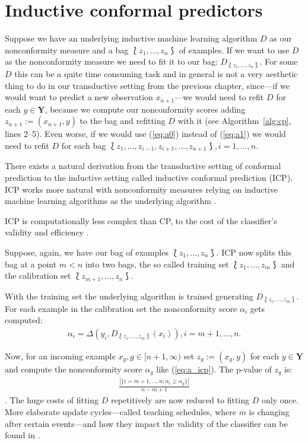 \documentclass[twoside,11pt]{article}
\begin{document}
\section{Inductive conformal predictors}
\label{sec:icp}

Suppose we have an underlying inductive machine learning
algorithm $D$ as our nonconformity measure and a bag
$\Lbag z_1,\dots,z_n \Rbag$ of examples. If we want to use
$D$ as the nonconformity measure we need to fit it to our
bag: $D_{\Lbag z_1,\dots,z_n \Rbag}$. For some $D$ this can
be a quite time consuming task and in general is not a very
aesthetic thing to do in our transductive setting from the
previous chapter, since---if we would want to predict a
new observation $x_{n+1}$---we would need to refit $D$ for
each $y \in \textbf{Y}$, because we compute our
nonconformity scores adding $z_{n+1} := (x_{n+1},y)$ to
the bag and refitting $D$ with it
(see Algorithm~\ref{alg:cp}, lines 2--5).
Even worse, if we would use (\ref{eq:a0}) instead of
(\ref{eq:a1}) we would need to refit $D$ for each bag
$\Lbag z_1,\dots,z_{i-1},z_{i+1},\dots,z_{n+1} \Rbag,
i=1,\dots,n$.

There exists a natural derivation from the transductive
setting of conformal prediction to the inductive setting
called inductive conformal prediction (ICP).
ICP works more natural with nonconformity measures relying
on inductive machine learning algorithms as the underlying
algorithm \citep[see][Chapter 4]{alrw}.

ICP is computationally less complex than CP, to the cost of
the classifier's validity and efficiency
\citep[see][Chapter 4]{alrw}.

Suppose, again, we have our bag of examples
$\Lbag z_1,\dots,z_n \Rbag$. ICP now splits this bag at a
point $m < n$ into two bags, the so called training set
$\Lbag z_1,\dots,z_m \Rbag$ and the calibration set
$\Lbag z_{m+1},\dots,z_n \Rbag$.

With the training set the underlying algorithm is trained
generating $D_{\Lbag z_1,\dots,z_m \Rbag}$. For each
example in the calibration set the nonconformity score
$\alpha_i$ gets computed:
\begin{align}
  \label{eq:a_icp}
  \alpha_i=\Delta(y_i,D_{\Lbag z_1,\dots,z_m \Rbag}(x_i)),
  i=m+1,\dots,n.
\end{align}

Now, for an incoming example $x_g, g \in [n+1,\infty)$ set
$z_{g} := (x_g, y)$ for each $y \in \textbf{Y}$ and compute
the nonconformity score $\alpha_g$ like (\ref{eq:a_icp}).
The p-value of $z_{g}$ is:
\begin{align*}
  \frac{|\{i = m+1,\dots,n: \alpha_i \geq \alpha_g\}|}
       {n-m+1}
\end{align*}
\citep[see][]{papadopoulos_et_al_2007}. The huge costs of
fitting $D$ repetitively are now reduced to fitting $D$
only once. More elaborate update cycles---called teaching
schedules, where $m$ is changing after certain events---and
how they impact the validity of the classifier can be found
in \citet[Chapters 4.3, 4.4]{alrw}.
\\\\
\end{document}
